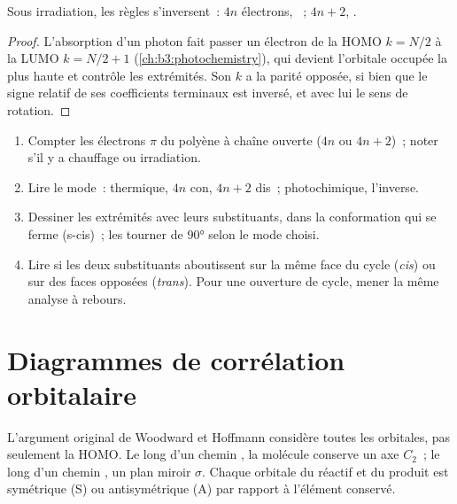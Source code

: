 \begin{proposition}\label{prop:b3:pericyclic:photo-electrocyclic}
Sous irradiation, les règles s'inversent~: $4n$ électrons, ~; $4n + 2$, .
\end{proposition}

\begin{proof}
L'absorption d'un photon fait passer un électron de la HOMO $k = N/2$ à la LUMO $k = N/2 + 1$
(\cref{ch:b3:photochemistry}), qui devient l'orbitale occupée la plus haute
et contrôle les extrémités. Son $k$ a la parité opposée, si bien que le signe relatif de ses
coefficients terminaux est inversé, et avec lui le sens de rotation.
\end{proof}

\begin{method}\label{met:b3:pericyclic:predict-stereo}
\begin{enumerate}
  \item Compter les électrons $\pi$ du polyène à chaîne ouverte ($4n$ ou $4n + 2$)~; noter s'il y a
        chauffage ou irradiation.
  \item Lire le mode~: thermique, $4n$ con, $4n + 2$ dis~; photochimique, l'inverse.
  \item Dessiner les extrémités avec leurs substituants, dans la
        conformation qui se ferme (s-cis)~; les tourner de 90° selon le mode
        choisi.
  \item Lire si les deux substituants aboutissent sur la même face du cycle
        (\textit{cis}) ou sur des faces opposées (\textit{trans}). Pour une ouverture de cycle, mener la même
        analyse à rebours.
\end{enumerate}
\end{method}

\section{Diagrammes de corrélation orbitalaire}

L'argument original de Woodward et Hoffmann considère toutes les
orbitales, pas seulement la HOMO. Le long d'un chemin , la
molécule conserve un axe $C_2$~; le long d'un chemin
, un plan miroir $\sigma$. Chaque orbitale du réactif et du
produit est symétrique (S) ou antisymétrique (A) par rapport à l'élément
conservé.

